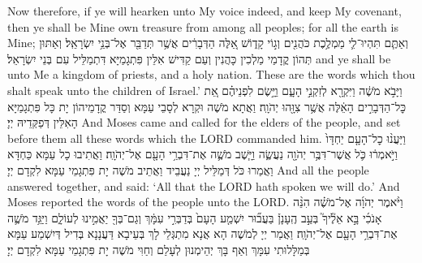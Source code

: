 {{Now therefore, if ye will hearken unto My voice indeed, and keep My covenant, then ye shall be Mine own treasure from among all peoples; for all the earth is Mine;}{}
{וְאַתֶּ֧ם תִּהְיוּ־לִ֛י מַמְלֶ֥כֶת כֹּהֲנִ֖ים וְג֣וֹי קָד֑וֹשׁ אֵ֚לֶּה הַדְּבָרִ֔ים אֲשֶׁ֥ר תְּדַבֵּ֖ר אֶל־בְּנֵ֥י יִשְׂרָאֵֽל׃
}
{וְאַתּוּן תְּהוֹן קֳדָמַי מַלְכִין כָּהֲנִין וְעַם קַדִּישׁ אִלֵּין פִּתְגָמַיָּא דִּתְמַלֵּיל עִם בְּנֵי יִשְׂרָאֵל׃}
{and ye shall be unto Me a kingdom of priests, and a holy nation. These are the words which thou shalt speak unto the children of Israel.’}{}
{וַיָּבֹ֣א מֹשֶׁ֔ה וַיִּקְרָ֖א לְזִקְנֵ֣י הָעָ֑ם וַיָּ֣שֶׂם לִפְנֵיהֶ֗ם אֵ֚ת כׇּל־הַדְּבָרִ֣ים הָאֵ֔לֶּה אֲשֶׁ֥ר צִוָּ֖הוּ יְהֹוָֽה׃}
{וַאֲתָא מֹשֶׁה וּקְרָא לְסָבֵי עַמָּא וְסַדַּר קֳדָמֵיהוֹן יָת כָּל פִּתְגָמַיָּא הָאִלֵּין דְּפַקְּדֵיהּ יְיָ׃}
{And Moses came and called for the elders of the people, and set before them all these words which the LORD commanded him.}{}
{וַיַּעֲנ֨וּ כׇל־הָעָ֤ם יַחְדָּו֙ וַיֹּ֣אמְר֔וּ כֹּ֛ל אֲשֶׁר־דִּבֶּ֥ר יְהֹוָ֖ה נַעֲשֶׂ֑ה וַיָּ֧שֶׁב מֹשֶׁ֛ה אֶת־דִּבְרֵ֥י הָעָ֖ם אֶל־יְהֹוָֽה׃
}
{וַאֲתִיבוּ כָל עַמָּא כַּחְדָּא וַאֲמַרוּ כֹּל דְּמַלֵּיל יְיָ נַעֲבֵיד וַאֲתֵיב מֹשֶׁה יָת פִּתְגָמֵי עַמָּא לִקְדָם יְיָ׃}
{And all the people answered together, and said: ‘All that the LORD hath spoken we will do.’ And Moses reported the words of the people unto the LORD.}{}
{וַיֹּ֨אמֶר יְהֹוָ֜ה אֶל־מֹשֶׁ֗ה הִנֵּ֨ה אָנֹכִ֜י בָּ֣א אֵלֶ֘יךָ֮ בְּעַ֣ב הֶֽעָנָן֒ בַּעֲב֞וּר יִשְׁמַ֤ע הָעָם֙ בְּדַבְּרִ֣י עִמָּ֔ךְ וְגַם־בְּךָ֖ יַאֲמִ֣ינוּ לְעוֹלָ֑ם וַיַּגֵּ֥ד מֹשֶׁ֛ה אֶת־דִּבְרֵ֥י הָעָ֖ם אֶל־יְהֹוָֽה׃
}
{וַאֲמַר יְיָ לְמֹשֶׁה הָא אֲנָא מִתְגְּלֵי לָךְ בְּעֵיבָא דַּעֲנָנָא בְּדִיל דְּיִשְׁמַע עַמָּא בְּמַלָּלוּתִי עִמָּךְ וְאַף בָּךְ יְהֵימְנוּן לְעָלַם וְחַוִּי מֹשֶׁה יָת פִּתְגָמֵי עַמָּא לִקְדָם יְיָ׃}
}
